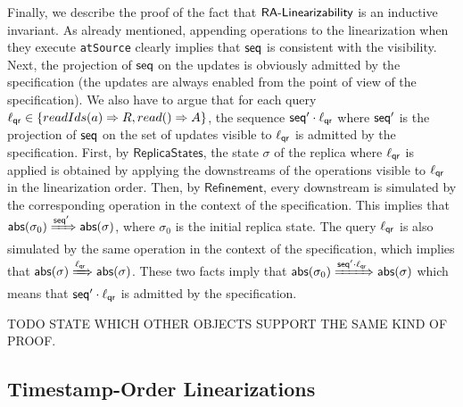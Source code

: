 Finally, we describe the proof of the fact that $\mathsf{\CRDTLinshort{}}$ is an inductive invariant. As already mentioned, appending operations to the linearization when they execute {\tt atSource} clearly implies that $\aseqord$ is consistent with the visibility. Next, the projection of $\aseqord$ on the updates is obviously admitted by the specification (the updates are always enabled from the point of view of the specification).
We also have to argue that for each query $\alabel_{\mathsf{qr}}\in\{\alabellongind[readIds]{a}{R}{},\alabellongind[read]{}{A}{}\}$, the sequence $\aseqord'\cdot \alabel_{\mathsf{qr}}$ where $\aseqord'$ is the projection of $\aseqord$ on the set of updates
visible to $\alabel_{\mathsf{qr}}$ is admitted by the specification. First, by $\mathsf{ReplicaStates}$, the state $\sigma$ of the replica where $\alabel_{\mathsf{qr}}$ is applied is obtained by applying the downstreams of the operations visible to $\alabel_{\mathsf{qr}}$ in the linearization order. Then, by $\mathsf{Refinement}$, every downstream is simulated by the corresponding operation in the context of the specification. This implies that $\refmap(\sigma_0)\xRightarrow{\aseqord'}\refmap(\sigma)$, where $\sigma_0$ is the initial replica state. The query $\alabel_{\mathsf{qr}}$ is also simulated by the same operation in the context of the specification, which implies that $\refmap(\sigma)\xRightarrow{\alabel_{\mathsf{qr}}}\refmap(\sigma)$. These two facts imply that $\refmap(\sigma_0)\xRightarrow{\aseqord'\cdot \alabel_{\mathsf{qr}}}\refmap(\sigma)$ which means that $\aseqord'\cdot \alabel_{\mathsf{qr}}$ is admitted by the specification.

TODO STATE WHICH OTHER OBJECTS SUPPORT THE SAME KIND OF PROOF.

\subsection{Timestamp-Order Linearizations}
\label{subsec:time-stamp order as linearizabtion}

